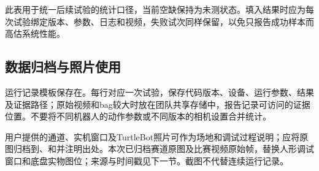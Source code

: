 此表用于统一后续试验的统计口径，当前空缺保持为未测状态。填入结果时应为每次试验绑定版本、参数、日志和视频，失败试次同样保留，以免只报告成功样本而高估系统性能。


\subsection{数据归档与照片使用}
运行记录模板保存在。每行对应一次试验，保存代码版本、设备、运行参数、结果及证据路径；原始视频和bag较大时放在团队共享存储中，报告记录可访问的证据位置。不要将不同机器人的动作参数或不同版本的相机设置合并统计。

用户提供的通道、实机窗口及TurtleBot照片可作为场地和调试过程说明；应将原图归档到、和并注明出处。本次已归档赛道原图及比赛视频原始帧，替换人形调试窗口和底盘实物图位；来源与时间戳见下一节。截图不代替连续运行记录。

